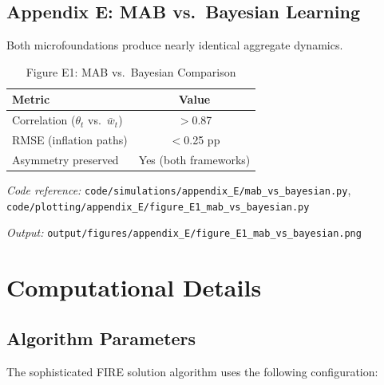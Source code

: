 \documentclass[11pt]{article}
\begin{document}
\subsection{Appendix E: MAB vs.\ Bayesian Learning}

Both microfoundations produce nearly identical aggregate dynamics.

\begin{table}[htbp]
\centering
\caption{Figure E1: MAB vs.\ Bayesian Comparison}
\label{tab:mab_bayesian}
\begin{threeparttable}
\begin{tabular}{lc}
\toprule
Metric & Value \\
\midrule
Correlation ($\theta_t$ vs.\ $\bar{w}_t$) & $>$0.87 \\
RMSE (inflation paths) & $<$0.25 pp \\
Asymmetry preserved & Yes (both frameworks) \\
\bottomrule
\end{tabular}
\begin{tablenotes}
\small
\item \textit{Code reference:} \texttt{code/simulations/appendix\_E/mab\_vs\_bayesian.py}, \texttt{code/plotting/appendix\_E/figure\_E1\_mab\_vs\_bayesian.py}
\item \textit{Output:} \texttt{output/figures/appendix\_E/figure\_E1\_mab\_vs\_bayesian.png}
\end{tablenotes}
\end{threeparttable}
\end{table}

\section{Computational Details}
\label{sec:computational}

\subsection{Algorithm Parameters}

The sophisticated FIRE solution algorithm uses the following configuration:
\end{document}
